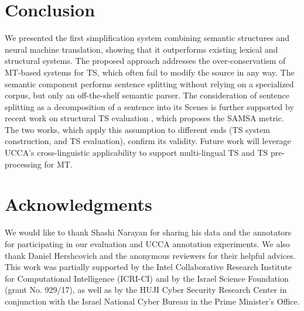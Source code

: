 \documentclass[11pt,a4paper]{article}
\begin{document}
\section{Conclusion} \label{sec:conclusion}
\vspace{-0.1cm}
We presented the first simplification system combining semantic structures and neural machine translation, showing that it outperforms
existing lexical and structural systems.
The proposed approach addresses the over-conservatism of MT-based systems for TS,
which often fail to modify the source in any way.
The semantic component performs sentence splitting without relying on a specialized corpus, 
but only an off-the-shelf semantic parser. The consideration of sentence splitting as a decomposition of a sentence into its Scenes is further supported by recent work on structural TS evaluation \citep{S18}, which proposes the \textsf{SAMSA} metric. The two works, which apply this assumption to different ends (TS system construction, and TS evaluation), confirm its validity.
Future work will leverage UCCA's cross-linguistic applicability to support multi-lingual TS and TS pre-processing for MT.

\vspace{-0.1cm}
\section*{Acknowledgments}
\vspace{-0.1cm}
We would like to thank Shashi Narayan for sharing his data and the annotators for participating in our evaluation and UCCA annotation experiments.
We also thank Daniel Hershcovich and the anonymous reviewers for their helpful advices. This work was partially supported by the Intel Collaborative Research Institute for Computational Intelligence (ICRI-CI) and by the Israel Science Foundation
(grant No. 929/17), as well as by the HUJI Cyber Security Research
Center in conjunction with the Israel National Cyber
Bureau in the Prime Minister's Office.




\end{document}
